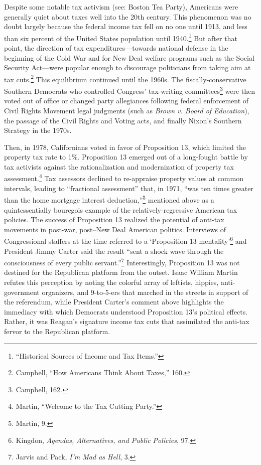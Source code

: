 \documentclass[
]{article}
\begin{document}
Despite some notable tax activism (see: Boston Tea Party), Americans were generally quiet about taxes well into the 20th century.
This phenomenon was no doubt largely because the federal income tax fell on no one until 1913, and less than six percent of the United States population until 1940.\footnote{``Historical Sources of Income and Tax Items.''}
But after that point, the direction of tax expenditures---towards national defense in the beginning of the Cold War and for New Deal welfare programs such as the Social Security Act---were popular enough to discourage politicians from taking aim at tax cuts.\footnote{Campbell, ``How Americans Think About Taxes,'' 160.}
This equilibrium continued until the 1960s.
The fiscally-conservative Southern Democrats who controlled Congress' tax-writing committees\footnote{Campbell, 162.} were then voted out of office or changed party allegiances following federal enforcement of Civil Rights Movement legal judgments (such as \emph{Brown v. Board of Education}), the passage of the Civil Rights and Voting acts, and finally Nixon's Southern Strategy in the 1970s.

Then, in 1978, Californians voted in favor of Proposition 13, which limited the property tax rate to 1\%.
Proposition 13 emerged out of a long-fought battle by tax activists against the rationalization and modernization of property tax assessment.\footnote{Martin, ``Welcome to the Tax Cutting Party.''}
Tax assessors declined to re-appraise property values at common intervals, leading to ``fractional assessment'' that, in 1971, ``was ten times greater than the home mortgage interest deduction,''\footnote{Martin, 9.} mentioned above as a quintessentially bouregois example of the relatively-regressive American tax policies.
The success of Proposition 13 realized the potential of anti-tax movements in post-war, post--New Deal American politics.
Interviews of Congressional staffers at the time referred to a `Proposition 13 mentality'\footnote{Kingdon, \emph{Agendas, Alternatives, and Public Policies}, 97.} and President Jimmy Carter said the result ``sent a shock wave through the consciousness of every public servant.''\footnote{Jarvis and Pack, \emph{I'm Mad as Hell}, 3.}
Interestingly, Proposition 13 was not destined for the Republican platform from the outset.
Isaac William Martin refutes this perception by noting the colorful array of leftists, hippies, anti-government organizers, and 9-to-5-ers that marched in the streets in support of the referendum, while President Carter's comment above highlights the immediacy with which Democrats understood Proposition 13's political effects.
Rather, it was Reagan's signature income tax cuts that assimilated the anti-tax fervor to the Republican platform.
\end{document}
